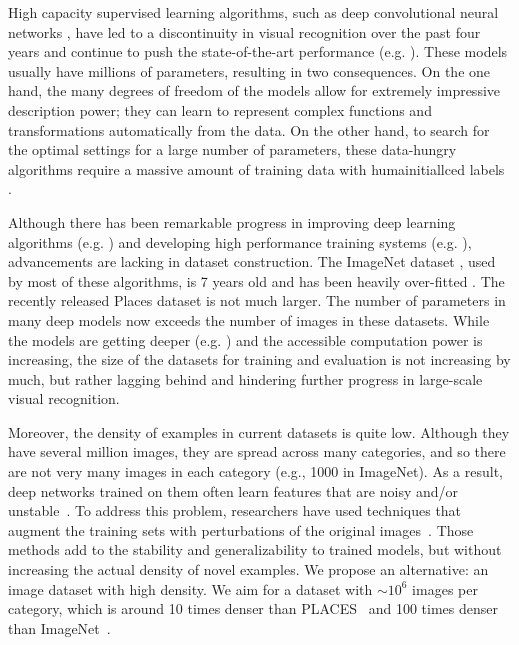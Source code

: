 High capacity supervised learning algorithms, such as deep
convolutional neural networks \cite{lecun1998gradient,AlexNet},
have led to a discontinuity in visual recognition over the past four
years and continue to push the state-of-the-art performance (e.g. \cite{MSRA,wu2015deep,GoogleNorm}). These models
usually have millions of parameters, resulting in two consequences.
On the one hand, the many degrees of freedom of the models allow for extremely impressive description power; they can learn to represent complex functions and transformations automatically from the
data. On the other hand, to search for the optimal settings for a
large number of parameters, these data-hungry algorithms require
a massive amount of training data with humainitiallced labels
\cite{deng2009imagenet,fei2007learning,xiao2010sun,zhou2014learning}.

Although there has been remarkable progress in improving deep
learning algorithms (e.g. \cite{MSRA,GoogLeNet}) and developing high
performance training systems (e.g. \cite{wu2015deep}), advancements
are lacking in dataset construction.  The ImageNet dataset
\cite{deng2009imagenet}, used by most of these algorithms, is
7 years old and has been heavily over-fitted \cite{BaiduScandal}.  The 
recently released Places \cite{zhou2014learning} dataset is not much larger.
The number of parameters in
many deep models now exceeds the number of images in these datasets.
While the models are getting deeper
(e.g. \cite{VGGnet,GoogLeNet}) and the accessible computation power is
increasing, the size of the datasets for training and evaluation is
not increasing by much, but rather lagging behind and hindering further
progress in large-scale visual recognition.

Moreover, the density of examples in current datasets
is quite low.  Although they have several million images,
they are spread across many categories, and so there
are not very many images in each category (e.g., 1000 in ImageNet). As a result,
deep networks trained on them often learn features that are noisy
and/or unstable~\cite{Intriguing,Fooled}. To address this problem,
researchers have used techniques that augment the training sets with
perturbations of the original images~\cite{wu2015deep}.  Those methods
add to the stability and generalizability to trained models, but without
increasing the actual density of novel examples.  We propose an
alternative: an image dataset with high density. %
We aim for a dataset with $\sim10^6$ images per category, which
is around 10 times denser than
PLACES~\cite{zhou2014learning} and 100 times denser than
ImageNet~\cite{deng2009imagenet}.

